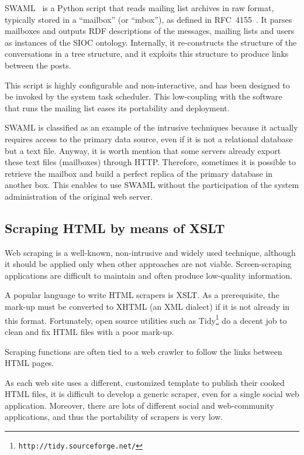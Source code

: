 \documentclass{../templates/www2008-submission}
\begin{document}
SWAML~\cite{SWAML2007} is a Python script that reads mailing 
list archives in raw format, typically stored in a ``mailbox'' 
(or ``mbox''), as defined in RFC~4155~\cite{RFC4155}. It parses
mailboxes and outputs RDF descriptions of the messages, mailing lists
and users as instances of the SIOC ontology. Internally, it re-constructs
the structure of the conversations in a tree structure, and it exploits
this structure to produce links between the posts.

This script is highly configurable and non-interactive, and has been
designed to be invoked by the system task scheduler. This low-coupling with
the software that runs the mailing list eases its portability and
deployment.

SWAML is classified as an example of the intrusive techniques because
it actually requires access to the primary data source, even if
it is not a relational database but a text file. Anyway, it is
worth mention that some servers already export these text files
(mailboxes) through HTTP. Therefore, sometimes it is possible to
retrieve the mailbox and build a perfect replica of the primary
database in another box. This enables to use SWAML without the
participation of the system administration of the original
web server.

\subsection{Scraping HTML by means of XSLT}

Web scraping is a well-known, non-intrusive and widely used technique,
although it should be applied only when other approaches are not viable.
Screen-scraping applications are difficult to maintain and
often produce low-quality information.

A popular language to write HTML scrapers is XSLT. As a prerequisite,
the mark-up must be converted to XHTML (an XML dialect) if it is not
already in this format. Fortunately, open source utilities such as
Tidy\footnote{\texttt{http://tidy.sourceforge.net/}} do a decent job
to clean and fix HTML files with a poor mark-up.

Scraping functions are often tied to a web crawler to follow the
links between HTML pages.

As each web site uses a different, customized template to
publish their cooked HTML files, it is
difficult to develop a generic scraper, even for a single social
web application. Moreover, there are lots of different social and
web-community applications, and thus the portability of scrapers
is very low.
\end{document}
